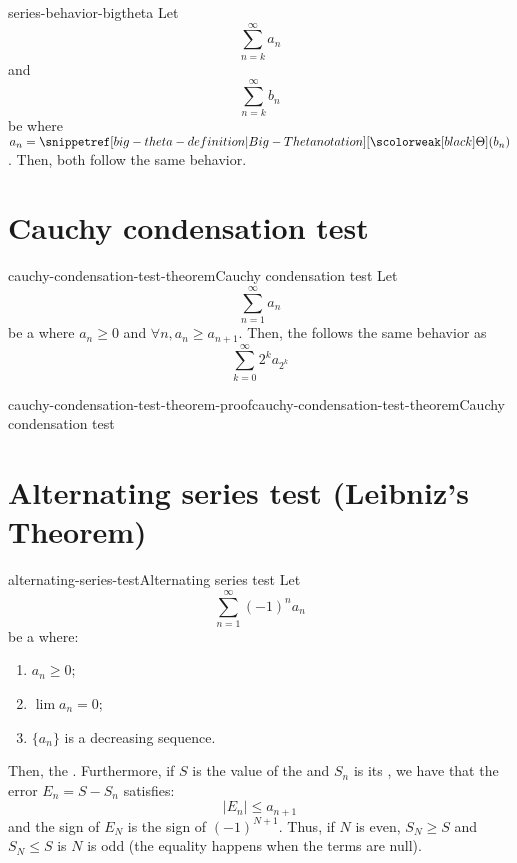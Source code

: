 \documentclass[preview]{standalone}
\begin{document}
\begin{snippetcorollary}{series-behavior-bigtheta}{}
    Let \[\sum_{n=k}^\infty a_n\] and \[\sum_{n=k}^\infty b_n\]
    be \series where \(a_n = \bigtheta(b_n)\). Then, both \series follow the same behavior.
\end{snippetcorollary}


\section{Cauchy condensation test}

\begin{snippettheorem}{cauchy-condensation-test-theorem}{Cauchy condensation test}
    Let
    \[
        \sum_{n=1}^\infty a_n
    \]
    be a \series where \(a_n \geq 0\) and \(\forall n, a_n \geq a_{n+1}\).
    Then, the \series follows the same behavior as
    \[
        \sum_{k=0}^\infty 2^k a_{2^k}
    \]
\end{snippettheorem}

\begin{snippetproof}{cauchy-condensation-test-theorem-proof}{cauchy-condensation-test-theorem}{Cauchy condensation test}
    \todo
\end{snippetproof}

\section{Alternating series test (Leibniz's Theorem)}

\begin{snippettheorem}{alternating-series-test}{Alternating series test}
    Let \[\sum_{n=1}^\infty {(-1)}^n a_n\] be a \series
    where:
    \begin{enumerate}
        \item \(a_n \geq 0\);
        \item \(\lim a_n = 0\);
        \item \(\{a_n\}\) is a decreasing sequence.
    \end{enumerate}
    Then, the \series \seriesconverges.
    Furthermore, if \(S\) is the value of the \series and \(S_n\) is its \partialsum,
    we have that the error \(E_n = S-S_n\) satisfies:
    \[ |E_n| \leq a_{n+1} \]
    and the sign of \(E_N\) is the sign of \({(-1)}^{N+1}\). Thus, if \(N\) is even, \(S_N\geq S\) and
    \(S_N \leq S\) is \(N\) is odd (the equality happens when the terms are null).
\end{snippettheorem}
\end{document}
